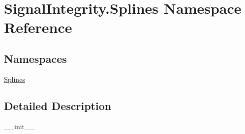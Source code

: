 \hypertarget{namespaceSignalIntegrity_1_1Splines}{}\section{Signal\+Integrity.\+Splines Namespace Reference}
\label{namespaceSignalIntegrity_1_1Splines}
\subsection*{Namespaces}
\begin{DoxyCompactItemize}
\item 
 \hyperlink{namespaceSignalIntegrity_1_1Splines_1_1Splines}{Splines}
\end{DoxyCompactItemize}


\subsection{Detailed Description}
\begin{DoxyVerb}__init__\end{DoxyVerb}
 